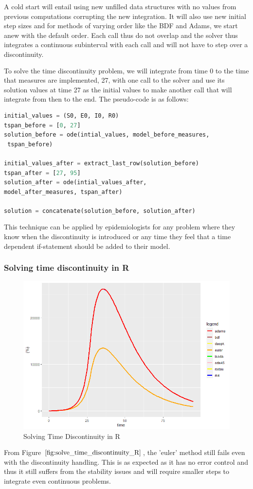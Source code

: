 A cold start will entail using new unfilled data structures with no values from previous computations corrupting the new integration. It will also use new initial step sizes and for methods of varying order like the BDF and Adams, we start anew with the default order.  Each call thus do not overlap and the solver thus integrates a continuous subinterval with each call and will not have to step over a discontinuity.

To solve the time discontinuity problem, we will integrate from time 0 to the time that measures are implemented, 27, with one call to the solver and use its solution values at time 27 as the initial values to make another call that will integrate from then to the end. The pseudo-code is as follows:

\begin{minipage}{\linewidth}
\begin{lstlisting}[language=Python]
initial_values = (S0, E0, I0, R0)
tspan_before = [0, 27]
solution_before = ode(intial_values, model_before_measures,
 tspan_before)

initial_values_after = extract_last_row(solution_before)
tspan_after = [27, 95]
solution_after = ode(intial_values_after, 
model_after_measures, tspan_after)

solution = concatenate(solution_before, solution_after)
\end{lstlisting}
\end{minipage}

This technique can be applied by epidemiologists for any problem where they know when the discontinuity is introduced or any time they feel that a time dependent if-statement should be added to their model.

 \subsubsection{Solving time discontinuity in R} 
\begin{figure}[h]
	\centering
	\includegraphics[width=0.7\linewidth]{./figures/solve_time_discontinuity_R}
	\caption{Solving Time Discontinuity in R}
	\label{fig:solve_time_discontinuity_R}
\end{figure}
From Figure $\ref{fig:solve_time_discontinuity_R}$, the 'euler' method still fails even with the discontinuity handling. This is as expected as it has no error control and thus it still suffers from the stability issues and will require smaller steps to integrate even continuous problems.

